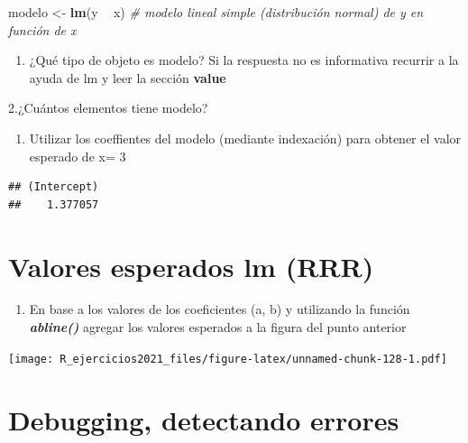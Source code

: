 \documentclass[]{book}
\newenvironment{Shaded}{\begin{snugshade}}{\end{snugshade}}
\newcommand{\CommentTok}[1]{\textcolor[rgb]{0.56,0.35,0.01}{\textit{#1}}}
\newcommand{\KeywordTok}[1]{\textcolor[rgb]{0.13,0.29,0.53}{\textbf{#1}}}
\newcommand{\NormalTok}[1]{#1}
\newcommand{\OperatorTok}[1]{\textcolor[rgb]{0.81,0.36,0.00}{\textbf{#1}}}
\newcommand{\StringTok}[1]{\textcolor[rgb]{0.31,0.60,0.02}{#1}}
\providecommand{\tightlist}{%
  \setlength{\itemsep}{0pt}\setlength{\parskip}{0pt}}
\begin{document}
\begin{Shaded}
\begin{Highlighting}[]
\NormalTok{modelo <-}\StringTok{ }\KeywordTok{lm}\NormalTok{(y }\OperatorTok{~}\StringTok{ }\NormalTok{x) }\CommentTok{# modelo lineal simple (distribución normal) de y en función de x }
\end{Highlighting}
\end{Shaded}

\begin{enumerate}
\def\labelenumi{\arabic{enumi}.}
\tightlist
\item
  ¿Qué tipo de objeto es modelo? Si la respuesta no es informativa recurrir a la ayuda de lm y leer la sección \textbf{value}
\end{enumerate}

2.¿Cuántos elementos tiene modelo?

\begin{enumerate}
\def\labelenumi{\arabic{enumi}.}
\setcounter{enumi}{2}
\tightlist
\item
  Utilizar los coeffientes del modelo (mediante indexación) para obtener el valor esperado de x= 3
\end{enumerate}

\begin{verbatim}
## (Intercept) 
##    1.377057
\end{verbatim}

\hypertarget{valores-esperados-lm-rrr}{%
\section{Valores esperados lm (RRR)}\label{valores-esperados-lm-rrr}}

\begin{enumerate}
\def\labelenumi{\arabic{enumi}.}
\tightlist
\item
  En base a los valores de los coeficientes (a, b) y utilizando la función \textbf{\emph{abline()}} agregar los valores esperados a la figura del punto anterior
\end{enumerate}

\texttt{[image: R\_ejercicios2021\_files/figure-latex/unnamed-chunk-128-1.pdf]}

\hypertarget{debugging-detectando-errores-4}{%
\section{Debugging, detectando errores}\label{debugging-detectando-errores-4}}
\end{document}
